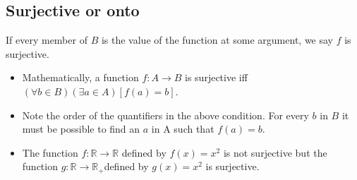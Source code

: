 \documentclass[12pt,a4paper]{article}
\begin{document}
\subsection{Surjective or onto} 
 If every member of \(B\) is the value of the function at some argument, we say \(f\) is surjective.
 \begin{itemize}
   \item Mathematically, a function \(f: A \rightarrow B\) is surjective iff \((\forall b \in B)(\exists a \in A)[f(a)=b]\).
   \item Note the order of the quantifiers in the above condition. For every \(b\) in \(B\) it must be possible to find an \(a\) in A such that \(f(a)=b\).
   \item The function \(f: \mathbb{R} \rightarrow \mathbb{R}\) defined by \(f(x)=x^2\) is not surjective but the function \(g: \mathbb{R} \rightarrow \mathbb{R}_{+}\)defined by \(g(x)=x^2\) is surjective.
 \end{itemize}
\end{document}
